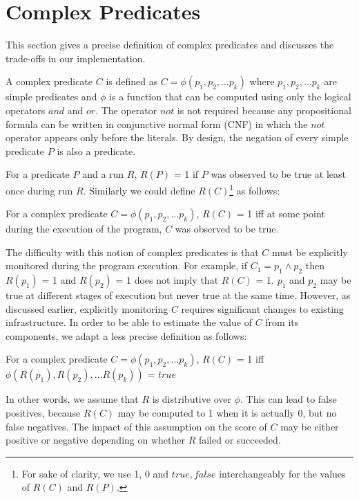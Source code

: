 
\section{Complex Predicates}
\label{sec-complex-preds}
This section gives a precise definition of complex predicates and discusses the trade-offs in our implementation.

A complex predicate $C$ is defined as $C = \phi(p_1, p_2, \ldots p_k)$ where $p_1, p_2, \ldots p_k$ are simple predicates and $\phi$ is a function that can be computed using only the logical operators $and$ and $or$.  The operator $not$ is not required because any propositional formula can be written in conjunctive normal form (CNF) in which the $not$ operator appears only before the literals.  By design, the negation of every simple predicate $P$ is also a predicate.

For a predicate $P$ and a run $R$, $R(P)$ = 1 if $P$ was observed to be true at least once during run $R$.  Similarly we could define $R(C)${\footnote{For sake of clarity, we use 1, 0 and $true, false$ interchangeably for the values of $R(C)$ and $R(P)$.}} as follows:
\begin{defn}
\label{dfn1}
For a complex predicate $C = \phi(p_1, p_2, \ldots p_k)$, $R(C)$ = 1 iff at some point during the execution of the program, $C$ was observed to be true.
\end{defn}

The difficulty with this notion of complex predicates is that $C$ must be explicitly monitored during the program execution.  For example, if $C_1 = p_1 \wedge p_2$ then $R(p_1)$ = 1 and $R(p_2)$ = 1 does not imply that $R(C)$ = 1.  $p_1$ and $p_2$ may be true at different stages of execution but never true at the same time.  However, as discussed earlier, explicitly monitoring $C$ requires significant changes to existing infrastructure.  In order to be able to estimate the value of $C$ from its components, we adapt a less precise definition as follows:
\begin{defn}
\label{dfn2}
For a complex predicate $C = \phi(p_1, p_2, \ldots p_k)$, $R(C)$ = 1 iff $\phi(R(p_1), R(p_2), \ldots R(p_k))$ = $true$
\end{defn}

In other words, we assume that $R$ is distributive over $\phi$.  This can lead to false positives, because $R(C)$ may be computed to 1 when it is actually 0, but no false negatives.  The impact of this assumption on the score of $C$ may be either positive or negative depending on whether $R$ failed or succeeded.

